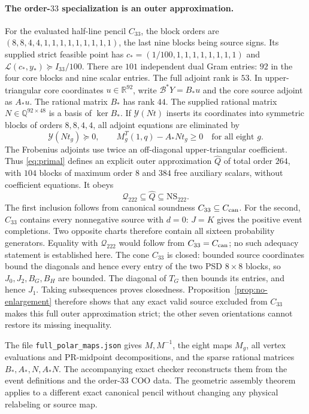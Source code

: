 \documentclass[11pt]{article}
\newcommand{\R}{\mathbb R}
\begin{document}
\paragraph{The order-$33$ specialization is an outer approximation.}
For the evaluated half-line pencil $C_{33}$, the block orders are
$(8,8,4,4,1,1,1,1,1,1,1,1,1)$, the last nine blocks being source signs.
Its supplied strict feasible point has
$c_*=(1/100,1,1,1,1,1,1,1,1)$ and
$\mathcal L(c_*,y_*)\succeq I_{33}/100$.
There are $101$ independent dual Gram entries: $92$ in the four core
blocks and nine scalar entries. The full adjoint rank is $53$.
In upper-triangular core coordinates $u\in\R^{92}$, write
$\mathcal B^*Y=B_*u$ and the core source adjoint as $A_*u$.
The rational matrix $B_*$ has rank $44$. The supplied rational matrix
$N\in\mathbb Q^{92\times48}$ is a basis of $\ker B_*$.
If $\mathcal Y(Nt)$ inserts its coordinates into symmetric blocks
of orders $8,8,4,4$, all adjoint equations are eliminated by
\begin{equation}
 \mathcal Y(Nt_g)\succeq0,\qquad
 M_g^T(1,q)-A_*Nt_g\ge0\quad\text{for all eight }g.       \label{eq:primal}
\end{equation}
The Frobenius adjoints use twice an off-diagonal upper-triangular
coefficient. Thus \eqref{eq:primal} defines an explicit outer
approximation $\widehat Q$ of total order $264$, with $104$ blocks of
maximum order $8$ and $384$ free auxiliary scalars, without coefficient
equations. It obeys
\[
                  \mathcal Q_{222}\subseteq\widehat Q
                                      \subseteq\mathrm{NS}_{222}.
\]
The first inclusion follows from canonical soundness
$C_{33}\subseteq C_{\rm can}$. For the second, $C_{33}$ contains every
nonnegative source with $d=0$: $J=K$ gives the positive event completions.
Two opposite charts therefore contain all sixteen probability generators.
Equality with $\mathcal Q_{222}$ would follow from
$C_{33}=C_{\rm can}$; no such adequacy statement is established here.
The cone $C_{33}$ is closed: bounded source coordinates bound the
diagonals and hence every entry of the two PSD $8\times8$ blocks,
so $J_0,J_2,B_G,B_H$ are bounded. The diagonal of $T_G$ then bounds
its entries, and hence $J_1$. Taking subsequences proves closedness.
Proposition~\ref{prop:no-enlargement} therefore shows that any exact
valid source excluded from $C_{33}$ makes this full outer approximation
strict; the other seven orientations cannot restore its missing inequality.

The file \texttt{full\_polar\_maps.json} gives $M,M^{-1}$, the eight
maps $M_g$, all vertex evaluations and PR-midpoint decompositions,
and the sparse rational matrices $B_*,A_*,N,A_*N$.
The accompanying exact checker reconstructs them from the event
definitions and the order-$33$ COO data. The geometric assembly theorem
applies to a different exact canonical pencil without changing any
physical relabeling or source map.
\end{document}
